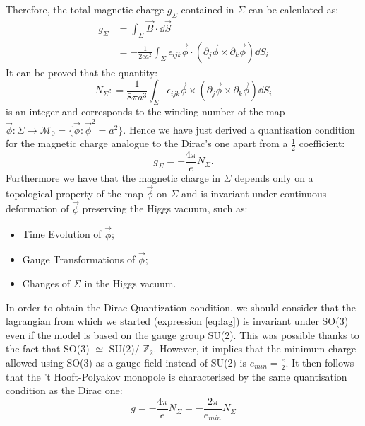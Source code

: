 \documentclass[main.tex]{subfiles}
\begin{document}
Therefore, the total magnetic charge $g_\Sigma$ contained in $\Sigma$ can be  calculated as: 
\begin{equation}
\begin{split}
g_\Sigma &= \int_\Sigma \vec{B} \cdot \dd{\vec{S}}  \\
         &= - \frac{1}{2ea^2}\int_\Sigma  \epsilon_{ijk} \vec{\phi} \cdot \left(  \partial_j\vec{\phi} \times \partial_k \vec{\phi}  \right) \dd{S_i}
\end{split}
\end{equation} 
It can be proved that the quantity:
\begin{equation}
N_\Sigma : = \frac{1}{8 \pi a^3} \int_\Sigma  \epsilon_{ijk} \vec{\phi} \times \left(  \partial_j\vec{\phi} \times \partial_k \vec{\phi}  \right) \dd{S_i}
\end{equation}
is an integer and corresponds to the winding number of the map $\vec{\phi} \colon \Sigma \to \mathcal{M}_0 = \{ \vec{\phi} : \vec{\phi}^2 = a^2 \}$. 
Hence we have just derived a quantisation condition for the magnetic charge analogue to the Dirac's one apart from a $\frac{1}{2}$ coefficient: 
\begin{equation}
g_\Sigma = -\frac{4 \pi}{e} N_\Sigma.
\end{equation}
Furthermore we have that the magnetic charge in $\Sigma$ depends only on  a topological property of the map $\vec{\phi}$ on $\Sigma$ and is invariant under continuous deformation of $\vec{\phi}$ preserving the Higgs vacuum, such as:
\begin{itemize}
    \item Time Evolution of $\vec{\phi}$;
    \item Gauge Transformations of $\vec{\phi}$;
    \item Changes of $\Sigma$ in the Higgs vacuum.
\end{itemize}
In order to obtain the Dirac Quantization condition, we should consider that the lagrangian from which we started (expression \ref{eq:lag}) is invariant under SO(3) even if the model is based on the gauge group SU(2). This was possible thanks to the fact that SO(3) $ \simeq$ SU(2)/ $\mathbb{Z}_2$. However, it implies that the minimum charge allowed using SO(3) as a gauge field instead of SU(2) is $ e_{min} =\frac{e}{2}$.
It then follows that the 't Hooft-Polyakov monopole is characterised by the same quantisation condition as the Dirac one: 
\begin{equation}
g = - \frac{4 \pi}{ e} N_\Sigma= - \frac{2 \pi}{ e_{min}} N_\Sigma
\end{equation}
\end{document}
